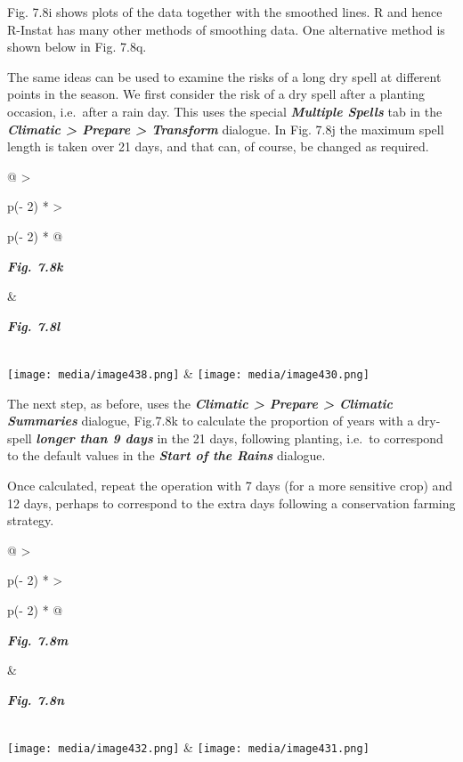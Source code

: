 \documentclass[
  letterpaper,
  DIV=11,
  numbers=noendperiod]{scrreprt}
\begin{document}
Fig. 7.8i shows plots of the data together with the smoothed lines. R
and hence R-Instat has many other methods of smoothing data. One
alternative method is shown below in Fig. 7.8q.

The same ideas can be used to examine the risks of a long dry spell at
different points in the season. We first consider the risk of a dry
spell after a planting occasion, i.e.~after a rain day. This uses the
special \textbf{\emph{Multiple Spells}} tab in the
\textbf{\emph{Climatic \textgreater{} Prepare \textgreater{} Transform}}
dialogue. In Fig. 7.8j the maximum spell length is taken over 21 days,
and that can, of course, be changed as required.

\begin{longtable}[]{@{}
  >{\raggedright\arraybackslash}p{(\columnwidth - 2\tabcolsep) * }
  >{\raggedright\arraybackslash}p{(\columnwidth - 2\tabcolsep) * }@{}}
\toprule\noalign{}
\begin{minipage}[b]{\linewidth}\raggedright
\textbf{\emph{Fig. 7.8k}}
\end{minipage} & \begin{minipage}[b]{\linewidth}\raggedright
\textbf{\emph{Fig. 7.8l}}
\end{minipage} \\
\midrule\noalign{}
\endhead
\bottomrule\noalign{}
\endlastfoot
\texttt{[image: media/image438.png]} &
\texttt{[image: media/image430.png]} \\
\end{longtable}

The next step, as before, uses the \textbf{\emph{Climatic \textgreater{}
Prepare \textgreater{} Climatic Summaries}} dialogue, Fig.7.8k to
calculate the proportion of years with a dry-spell \textbf{\emph{longer
than 9 days}} in the 21 days, following planting, i.e.~to correspond to
the default values in the \textbf{\emph{Start of the Rains}} dialogue.

Once calculated, repeat the operation with 7 days (for a more sensitive
crop) and 12 days, perhaps to correspond to the extra days following a
conservation farming strategy.

\begin{longtable}[]{@{}
  >{\raggedright\arraybackslash}p{(\columnwidth - 2\tabcolsep) * }
  >{\raggedright\arraybackslash}p{(\columnwidth - 2\tabcolsep) * }@{}}
\toprule\noalign{}
\begin{minipage}[b]{\linewidth}\raggedright
\textbf{\emph{Fig. 7.8m}}
\end{minipage} & \begin{minipage}[b]{\linewidth}\raggedright
\textbf{\emph{Fig. 7.8n}}
\end{minipage} \\
\midrule\noalign{}
\endhead
\bottomrule\noalign{}
\endlastfoot
\texttt{[image: media/image432.png]} &
\texttt{[image: media/image431.png]} \\
\end{longtable}
\end{document}
